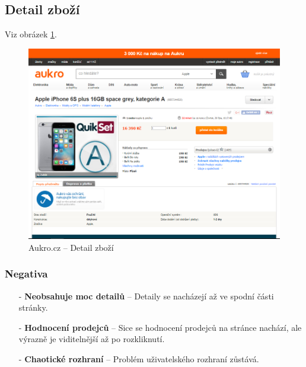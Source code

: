 
\newpage
\subsection{Detail zboží}
Viz obrázek \ref{fig:aukro:detail}.
\begin{figure}[h]
    \centering
    \includegraphics[width=1.0\textwidth]{media/aukro/detail.png}
    \caption{Aukro.cz -- Detail zboží}
    \label{fig:aukro:detail}
\end{figure}
\subsubsection*{Negativa}
\begin{itemize}
    \item[-] \textbf{Neobsahuje moc detailů} -- Detaily se nacházejí až ve spodní části stránky.
    \item[-] \textbf{Hodnocení prodejců} -- Sice se hodnocení prodejců na stránce nachází, ale výrazně je viditelnější až po rozkliknutí.
    \item[-] \textbf{Chaotické rozhraní} -- Problém uživatelského rozhraní zůstává.
\end{itemize}



\newpage
